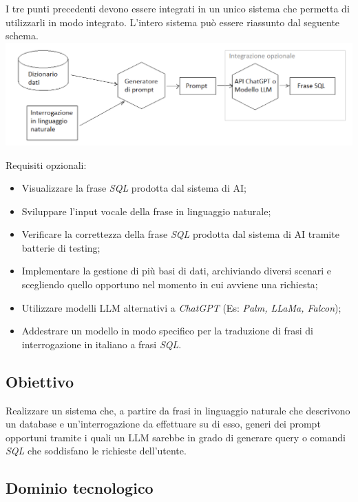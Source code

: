 \documentclass{article}
\begin{document}
I tre punti precedenti devono essere integrati in un unico sistema che permetta di utilizzarli in modo integrato. L’intero sistema può essere riassunto dal seguente schema.\\
\includegraphics[width=1\textwidth]{img_Zucc.png}

Requisiti opzionali:

\begin{itemize}
    \item Visualizzare la frase \textit{SQL} prodotta dal sistema di AI;
    \item Sviluppare l’input vocale della frase in linguaggio naturale;
    \item Verificare la correttezza della frase \textit{SQL} prodotta dal sistema di AI tramite batterie di testing;
    \item Implementare la gestione di più basi di dati, archiviando diversi scenari e scegliendo quello opportuno nel momento in cui avviene una richiesta;
    \item Utilizzare modelli LLM alternativi a \textit{ChatGPT} (Es: \textit{Palm, LLaMa, Falcon});
    \item Addestrare un modello in modo specifico per la traduzione di frasi di interrogazione in italiano a frasi \textit{SQL}.
\end{itemize}


\subsection{Obiettivo}
Realizzare un sistema che, a partire da frasi in linguaggio naturale che descrivono 
un database e un’interrogazione da effettuare su di esso, generi dei prompt 
opportuni tramite i quali un LLM sarebbe in grado di generare query o comandi 
\textit{SQL} che soddisfano le richieste dell’utente.



\subsection{Dominio tecnologico}
\end{document}
